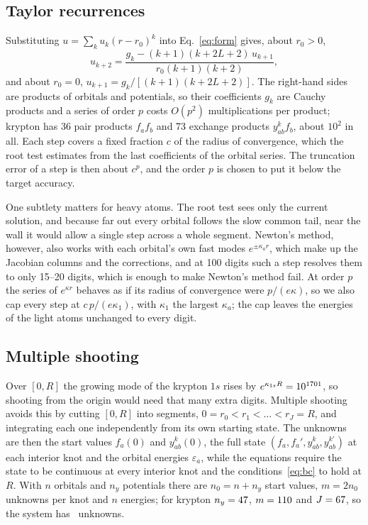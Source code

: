 \documentclass[aps,pra,reprint,superscriptaddress,amsmath,amssymb,longbibliography]{revtex4-2}
\begin{document}
\subsection{Taylor recurrences}\label{sec:taylor}

Substituting $u=\sum_ku_k(r-r_0)^k$ into Eq.~\eqref{eq:form} gives, about $r_0>0$,
\begin{equation}
u_{k+2}=\frac{g_k-(k+1)(k+2L+2)\,u_{k+1}}{r_0(k+1)(k+2)}, \label{eq:recurrence}
\end{equation}
and about $r_0=0$, $u_{k+1}=g_k/[(k+1)(k+2L+2)]$. The right-hand sides are products of orbitals and potentials, so their coefficients $g_k$ are Cauchy products and a series of order $p$ costs $O(p^2)$ multiplications per product; krypton has 36 pair products $f_af_b$ and 73 exchange products $y^k_{ab}f_b$, about $10^2$ in all. Each step covers a fixed fraction $c$ of the radius of convergence, which the root test estimates from the last coefficients of the orbital series. The truncation error of a step is then about $c^p$, and the order $p$ is chosen to put it below the target accuracy.

One subtlety matters for heavy atoms. The root test sees only the current solution, and because far out every orbital follows the slow common tail, near the wall it would allow a single step across a whole segment. Newton's method, however, also works with each orbital's own fast modes $e^{\pm\kappa_ar}$, which make up the Jacobian columns and the corrections, and at 100 digits such a step resolves them to only 15--20 digits, which is enough to make Newton's method fail. At order $p$ the series of $e^{\kappa r}$ behaves as if its radius of convergence were $p/(e\kappa)$, so we also cap every step at $c\,p/(e\kappa_1)$, with $\kappa_1$ the largest $\kappa_a$; the cap leaves the energies of the light atoms unchanged to every digit.

\subsection{Multiple shooting}\label{sec:shooting}

Over $[0,R]$ the growing mode of the krypton $1s$ rises by $e^{\kappa_{1s}R}=10^{1701}$, so shooting from the origin would need that many extra digits. Multiple shooting~\cite{Ascher1995} avoids this by cutting $[0,R]$ into segments, $0=r_0<r_1<\dots<r_J=R$, and integrating each one independently from its own starting state. The unknowns are then the start values $f_a(0)$ and $y^k_{ab}(0)$, the full state $(f_a,f_a',y^k_{ab},y^{k\prime}_{ab})$ at each interior knot and the orbital energies $\varepsilon_a$, while the equations require the state to be continuous at every interior knot and the conditions~\eqref{eq:bc} to hold at $R$. With $n$ orbitals and $n_y$ potentials there are $n_0=n+n_y$ start values, $m=2n_0$ unknowns per knot and $n$ energies; for krypton $n_y=47$, $m=110$ and $J=67$, so the system has \KrUnknowns\ unknowns.
\end{document}
